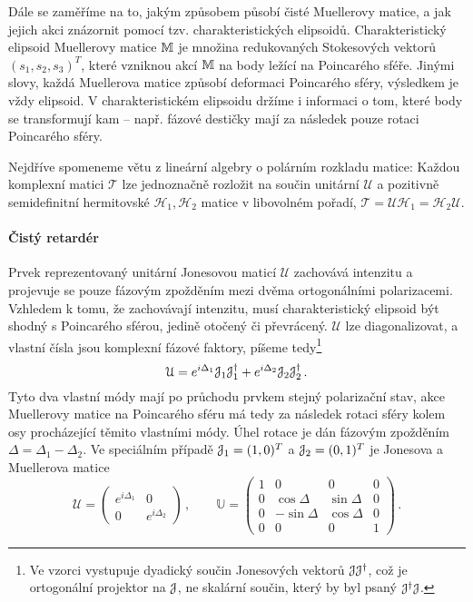 Dále se zaměříme na to, jakým způsobem působí čisté Muellerovy matice, a jak jejich akci znázornit pomocí tzv. charakteristických elipsoidů.
Charakteristický elipsoid Muellerovy matice $\mathbb{M}$ je množina redukovaných Stokesových vektorů $(s_1, s_2, s_3)^T$, které vzniknou akcí $\mathbb{M}$ na body ležící na Poincarého sféře.
Jinými slovy, každá Muellerova matice způsobí deformaci Poincarého sféry, výsledkem je vždy elipsoid.
V charakteristickém elipsoidu držíme i informaci o tom, které body se transformují kam -- např. fázové destičky mají za následek pouze rotaci Poincarého sféry.

Nejdříve spomeneme větu z lineární algebry o polárním rozkladu matice\cite{motlPestujemeLinearniAlgebru2002}: Každou komplexní matici $\mathcal{T}$ lze jednoznačně rozložit na součin unitární $\mathcal{U}$ a pozitivně semidefinitní hermitovské $\mathcal{H}_1, \mathcal{H}_2$ matice v libovolném pořadí, $\mathcal{T}=\mathcal{U}\mathcal{H}_1 = \mathcal{H}_2 \mathcal{U}$.

\paragraph{Čistý retardér}

Prvek reprezentovaný unitární Jonesovou maticí $\mathcal{U}$ zachovává intenzitu a projevuje se pouze fázovým zpožděním mezi dvěma ortogonálními polarizacemi.
Vzhledem k tomu, že zachovávají intenzitu, musí charakteristický elipsoid být shodný s Poincarého sférou, jedině otočený či převrácený.
$\mathcal{U}$ lze diagonalizovat, a vlastní čísla jsou komplexní fázové faktory, píšeme tedy\footnote{Ve vzorci vystupuje dyadický součin Jonesových vektorů $\mathcal{J}\mathcal{J}^\dagger$, což je ortogonální projektor na $\mathcal{J}$, ne skalární součin, který by byl psaný $\mathcal{J}^\dagger \mathcal{J}$.}
\begin{equation}
    \mathcal{U}=e^{i\Delta_1} \mathcal{J}_1 \mathcal{J}_1^\dagger + e^{i\Delta_2} \mathcal{J}_2 \mathcal{J}_2^\dagger\,.
\end{equation}
Tyto dva vlastní módy mají po průchodu prvkem stejný polarizační stav, akce Muellerovy matice na Poincarého sféru má tedy za následek rotaci sféry kolem osy procházející těmito vlastními módy.
Úhel rotace je dán fázovým zpožděním $\Delta=\Delta_1-\Delta_2$.
Ve speciálním případě $\mathcal{J}_1=(1,0)^T$ a $\mathcal{J}_2=(0,1)^T$ je Jonesova a Muellerova matice
\begin{equation}
    \mathcal{U}=\begin{pmatrix}
        e^{i\Delta_1} & 0 \\ 0 & e^{i\Delta_2}
        \end{pmatrix} \,, \qquad
    \mathbb{U}=\begin{pmatrix}
        1 & 0 & 0 & 0 \\ 0 & \cos\Delta & \sin\Delta & 0 \\
        0 & -\sin\Delta & \cos\Delta & 0 \\ 0 & 0 & 0 & 1
        \end{pmatrix} \,.
\end{equation}

